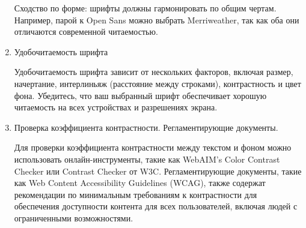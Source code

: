 \begin{enumerate}
    Сходство по форме: шрифты должны гармонировать по общим чертам. Например, парой к Open Sans можно выбрать Merriweather, так как оба они отличаются современной читаемостью.

    \item Удобочитаемость шрифта

Удобочитаемость шрифта зависит от нескольких факторов, включая размер, начертание, интерлиньяж (расстояние между строками), контрастность и цвет фона. Убедитесь, что ваш выбранный шрифт обеспечивает хорошую читаемость на всех устройствах и разрешениях экрана.

    \item Проверка коэффициента контрастности. Регламентирующие документы.

Для проверки коэффициента контрастности между текстом и фоном можно использовать онлайн-инструменты, такие как WebAIM's Color Contrast Checker или Contrast Checker от W3C. Регламентирующие документы, такие как Web Content Accessibility Guidelines (WCAG), также содержат рекомендации по минимальным требованиям к контрастности для обеспечения доступности контента для всех пользователей, включая людей с ограниченными возможностями.
\end{enumerate}



